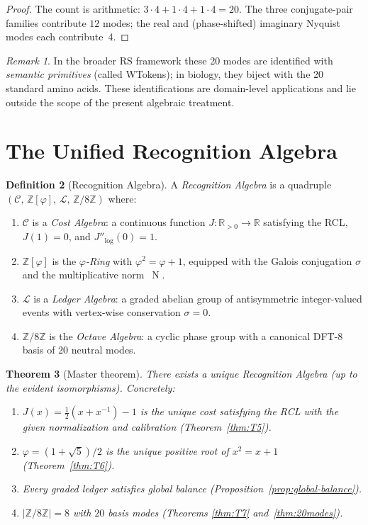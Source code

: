\documentclass[11pt,a4paper]{article}
\theoremstyle{plain}
\newtheorem{theorem}{Theorem}[section]
\theoremstyle{definition}
\newtheorem{definition}[theorem]{Definition}
\theoremstyle{remark}
\newtheorem{remark}[theorem]{Remark}
\newcommand{\phig}{\varphi}
\newcommand{\Jcost}{J}
\newcommand{\RR}{\mathbb{R}}
\newcommand{\ZZ}{\mathbb{Z}}
\DeclareMathOperator{\Nm}{N}             %
\newcommand{\conj}{\sigma}               %
\begin{document}
\begin{proof}
The count is arithmetic: $3\cdot4+1\cdot4+1\cdot4=20$.  The
three conjugate-pair families contribute $12$ modes; the real and
(phase-shifted) imaginary Nyquist modes each contribute~$4$.
\end{proof}

\begin{remark}
In the broader RS framework these 20 modes are identified with
\emph{semantic primitives} (called WTokens); in biology, they
biject with the 20 standard amino acids.  These identifications are
domain-level applications and lie outside the scope of the present
algebraic treatment.
\end{remark}


\section{The Unified Recognition Algebra}\label{sec:unified}

\begin{definition}[Recognition Algebra]\label{def:rec-alg}
A \emph{Recognition Algebra} is a quadruple
$(\mathcal C,\,\ZZ[\phig],\,\mathcal L,\,\ZZ/8\ZZ)$ where:
\begin{enumerate}[nosep]
\item $\mathcal C$ is a \emph{Cost Algebra}: a continuous function
  $\Jcost:\RR_{>0}\to\RR$ satisfying the RCL, $\Jcost(1)=0$, and
  $\Jcost''_{\!\log}(0)=1$.
\item $\ZZ[\phig]$ is the \emph{$\phig$-Ring} with $\phig^2=\phig+1$,
  equipped with the Galois conjugation $\conj$ and the multiplicative
  norm~$\Nm$.
\item $\mathcal L$ is a \emph{Ledger Algebra}: a graded abelian group
  of antisymmetric integer-valued events with vertex-wise conservation
  $\sigma=0$.
\item $\ZZ/8\ZZ$ is the \emph{Octave Algebra}: a cyclic phase group
  with a canonical DFT-8 basis of 20 neutral modes.
\end{enumerate}
\end{definition}

\begin{theorem}[Master theorem]\label{thm:master}
There exists a unique Recognition Algebra (up to the evident
isomorphisms).  Concretely:
\begin{enumerate}[nosep,label=\textup{(\roman*)}]
\item $\Jcost(x)=\frac12(x{+}x^{-1})-1$ is the unique cost
  satisfying the RCL with the given normalization and calibration
  (Theorem~\ref{thm:T5}).
\item $\phig=(1{+}\sqrt5)/2$ is the unique positive root of
  $x^2=x+1$ (Theorem~\ref{thm:T6}).
\item Every graded ledger satisfies global balance
  (Proposition~\ref{prop:global-balance}).
\item $|\ZZ/8\ZZ|=8$ with $20$ basis modes (Theorems
  \ref{thm:T7} and~\ref{thm:20modes}).
\end{enumerate}
\end{theorem}
\end{document}
